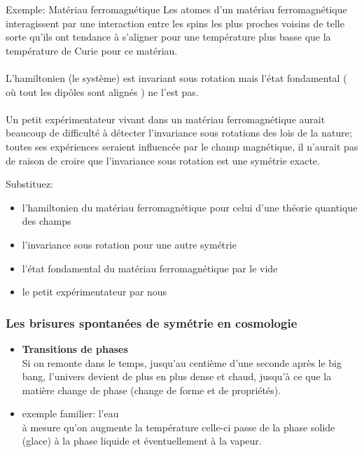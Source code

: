 \documentclass{beamer}
\begin{document}
\begin{frame} 
\begin{exampleblock}{Exemple: Matériau ferromagnétique}
Les atomes d'un matériau ferromagnétique interagissent par une interaction entre les spins les plus proches voisins
de telle sorte qu'ils ont tendance à s'aligner pour une température plus basse que la température de Curie pour ce matériau.\\
~~\\
L'hamiltonien (le système) est invariant sous rotation mais l'état fondamental ( où tout les dipôles sont alignés ) ne l'est pas.\\
~~\\
Un petit expérimentateur vivant dans un matériau ferromagnétique aurait beaucoup de difficulté à détecter l'invariance sous rotations des lois de la nature; toutes ses expériences seraient influencée par le champ magnétique, il n'aurait pas de raison de croire que l'invariance sous rotation est une symétrie exacte.
\end{exampleblock}
\end{frame}


\begin{frame} 
Substituez:
\begin{itemize}
\item<2-> l'hamiltonien du matériau ferromagnétique pour celui d'une théorie quantique des champs
\item<2-> l'invariance sous rotation pour une autre symétrie
\item<2-> l'état fondamental du matériau ferromagnétique par le vide
\item<2-> le petit expérimentateur par nous
\end{itemize}
\end{frame}




\begin{frame}
\frametitle{Les brisures spontanées de symétrie en cosmologie}
\begin{itemize}
  \item\textbf{Transitions de phases}\\
  Si on remonte dans le temps, jusqu'au centième d'une seconde après le big bang, l'univers devient de plus en plus dense et chaud, jusqu'à ce que la matière change de phase (change de forme et de propriétés).
  \item exemple familier: l'eau\\
  à mesure qu'on augmente la température celle-ci passe de la phase solide (glace) à la phase liquide et éventuellement à la vapeur.
  \end{itemize}
\end{frame}
\end{document}
